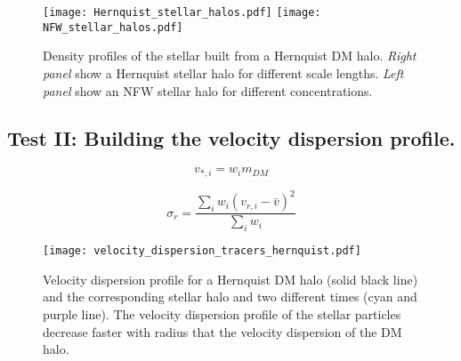 \documentclass[14pt]{article}
\begin{document}
\begin{figure}[H]
   \texttt{[image: Hernquist\_stellar\_halos.pdf]}
   \texttt{[image: NFW\_stellar\_halos.pdf]}
   \caption{Density profiles of the stellar built from a Hernquist DM halo.
   \textit{Right panel} show a Hernquist stellar halo for different scale
   lengths. \textit{Left panel} show an NFW stellar halo for different
   concentrations.}
\end{figure}

\subsection{Test II: Building the velocity dispersion profile. }

\begin{equation}
  v_{*,i} = w_i m_{DM} 
\end{equation}


\begin{equation}
  \sigma_r = \dfrac{\sum_i w_i (v_{r,i}-\bar{v})^2}{\sum_i w_i}
\end{equation}

\begin{figure}[H]
  \centering
  \texttt{[image: velocity\_dispersion\_tracers\_hernquist.pdf]}
  \caption{Velocity dispersion profile for a Hernquist DM halo (solid black line)  and
  the corresponding stellar halo and two different times (cyan and purple line).
  The velocity dispersion profile of the stellar particles decrease faster with
  radius that the velocity dispersion of the DM halo.}
\end{figure}
\end{document}
